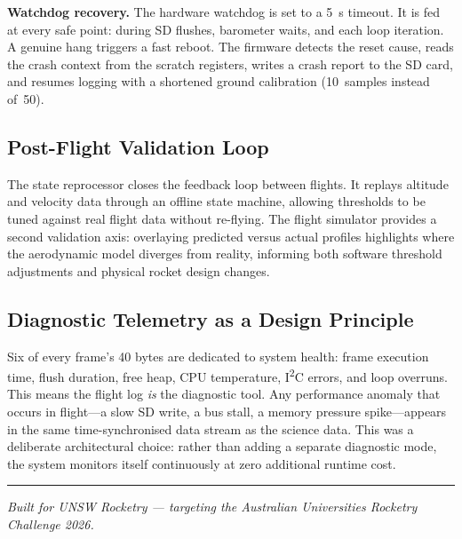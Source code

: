 \documentclass[11pt, a4paper]{article}
\begin{document}
\textbf{Watchdog recovery.} The hardware watchdog is set to a \SI{5}{\second} timeout. It is fed at every safe point: during SD flushes, barometer waits, and each loop iteration. A genuine hang triggers a fast reboot. The firmware detects the reset cause, reads the crash context from the scratch registers, writes a crash report to the SD card, and resumes logging with a shortened ground calibration (10~samples instead of~50).

\subsection{Post-Flight Validation Loop}

The state reprocessor closes the feedback loop between flights. It replays altitude and velocity data through an offline state machine, allowing thresholds to be tuned against real flight data without re-flying. The flight simulator provides a second validation axis: overlaying predicted versus actual profiles highlights where the aerodynamic model diverges from reality, informing both software threshold adjustments and physical rocket design changes.

\subsection{Diagnostic Telemetry as a Design Principle}

Six of every frame's 40 bytes are dedicated to system health: frame execution time, flush duration, free heap, CPU temperature, I\textsuperscript{2}C errors, and loop overruns. This means the flight log \textit{is} the diagnostic tool. Any performance anomaly that occurs in flight---a slow SD write, a bus stall, a memory pressure spike---appears in the same time-synchronised data stream as the science data. This was a deliberate architectural choice: rather than adding a separate diagnostic mode, the system monitors itself continuously at zero additional runtime cost.

\vspace{1em}
\hrule
\vspace{0.5em}
\begin{center}
\small\textit{Built for UNSW Rocketry --- targeting the Australian Universities Rocketry Challenge 2026.}
\end{center}
\end{document}
